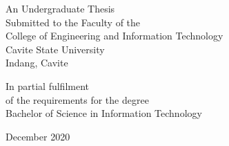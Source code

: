 \begin{singlespace}
	\begin{titlepage}
		\begin{center}
			\textbf{\thesistitle{}}

			\vfill
			\center
			An Undergraduate Thesis\\
			Submitted to the Faculty of the\\
			College of Engineering and Information Technology\\
			Cavite State University\\
			Indang, Cavite

			\vfill
			\center
			In partial fulfilment\\
			of the requirements for the degree\\
			Bachelor of Science in Information Technology

			\vfill
			\thesisautors{}
			{December 2020}

		\end{center}
	\end{titlepage}
\end{singlespace}
